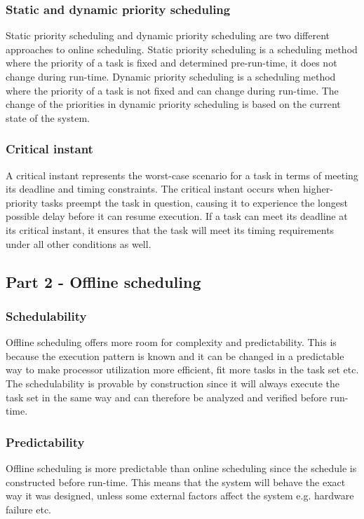             \subsubsection{\textbf{Static and dynamic priority scheduling}}
            Static priority scheduling and dynamic priority scheduling are two different approaches to online scheduling. Static priority scheduling is a scheduling method where the priority of a task is fixed and determined pre-run-time, it does not change during run-time. Dynamic priority scheduling is a scheduling method where the priority of a task is not fixed and can change during run-time. The change of the priorities in dynamic priority scheduling is based on the current state of the system.

            \subsubsection{\textbf{Critical instant}}
            A critical instant represents the worst-case scenario for a task in terms of meeting its deadline and timing constraints. The critical instant occurs when higher-priority tasks preempt the task in question, causing it to experience the longest possible delay before it can resume execution. If a task can meet its deadline at its critical instant, it ensures that the task will meet its timing requirements under all other conditions as well.

        \subsection{Part 2 - Offline scheduling}
            \subsubsection{\textbf{Schedulability}}
            Offline scheduling offers more room for complexity and predictability. This is because the execution pattern is known and it can be changed in a predictable way to make processor utilization more efficient, fit more tasks in the task set etc. The schedulability is provable by construction since it will always execute the task set in the same way and can therefore be analyzed and verified before run-time.

            \subsubsection{\textbf{Predictability}}
            Offline scheduling is more predictable than online scheduling since the schedule is constructed before run-time. This means that the system will behave the exact way it was designed, unless some external factors affect the system e.g. hardware failure etc.

